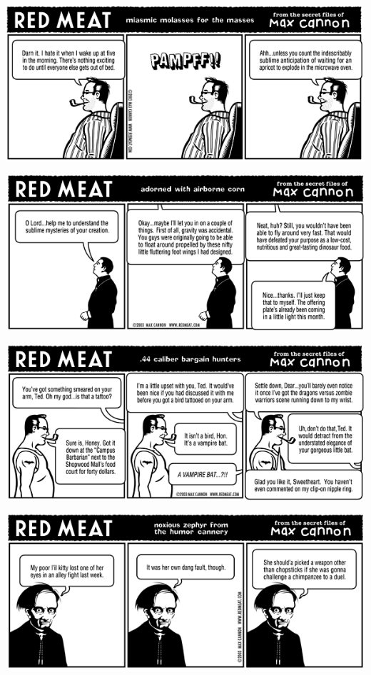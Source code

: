 \documentclass[a4paper,twoside,11pt]{article}
\begin{document}
\includegraphics[width=\textwidth]{redmeat_2003-02-18.png}



\includegraphics[width=\textwidth]{redmeat_2003-02-25.png}



\includegraphics[width=\textwidth]{redmeat_2003-03-04.png}



\includegraphics[width=\textwidth]{redmeat_2003-03-11.png}
\end{document}
